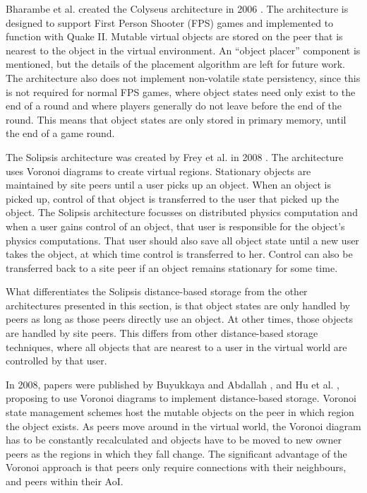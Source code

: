 Bharambe et al. created the Colyseus architecture in 2006 \cite{colyseus_distance_based}. The architecture is designed to support First Person Shooter (FPS) games and implemented to function with Quake II. Mutable virtual objects are stored on the peer that is nearest to the object in the virtual environment. An ``object placer'' component is mentioned, but the details of the placement algorithm are left for future work. The architecture also does not implement non-volatile state persistency, since this is not required for normal FPS games, where object states need only exist to the end of a round and where players generally do not leave before the end of the round. This means that object states are only stored in primary memory, until the end of a game round.

The Solipsis architecture was created by Frey et al. in 2008 \cite{solipsis}. The architecture uses Voronoi diagrams to create virtual regions. Stationary objects are maintained by site peers until a user picks up an object. When an object is picked up, control of that object is transferred to the user that picked up the object. The Solipsis architecture focusses on distributed physics computation and when a user gains control of an object, that user is responsible for the object's physics computations. That user should also save all object state until a new user takes the object, at which time control is transferred to her. Control can also be transferred back to a site peer if an object remains stationary for some
time.

What differentiates the Solipsis distance-based storage from the other architectures presented in this section, is that object states are only handled by peers as long as those peers directly use an object. At other times, those objects are handled by site peers. This differs from other distance-based storage techniques, where all objects that are nearest to a user in the virtual world are controlled by that user.

In 2008, papers were published by Buyukkaya and Abdallah \cite{Buyukkaya_voronoi_state_management}, and Hu et al. \cite{Hu_voronoi_IM}, proposing to use Voronoi diagrams \cite{voronoi_diagrams_survey} to implement distance-based storage. Voronoi state management schemes host the mutable objects on the peer in which region the object exists. As peers move around in the virtual world, the Voronoi diagram has to be constantly recalculated and objects have to be moved to new owner peers as the regions in which they fall change. The significant advantage of the Voronoi approach is that peers only require connections with their neighbours, and peers within their AoI.

